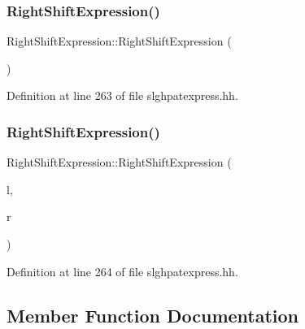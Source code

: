 \subsubsection{\texorpdfstring{RightShiftExpression()}{RightShiftExpression()}\hspace{0.1cm}{\footnotesize\ttfamily [1/2]}}
{\footnotesize\ttfamily Right\+Shift\+Expression\+::\+Right\+Shift\+Expression (\begin{DoxyParamCaption}\item[{void}]{ }\end{DoxyParamCaption})\hspace{0.3cm}{\ttfamily [inline]}}



Definition at line 263 of file slghpatexpress.\+hh.

\mbox{\label{class_right_shift_expression_ab56635d4e261a1e50ef8b1accbbca80e}} 
\subsubsection{\texorpdfstring{RightShiftExpression()}{RightShiftExpression()}\hspace{0.1cm}{\footnotesize\ttfamily [2/2]}}
{\footnotesize\ttfamily Right\+Shift\+Expression\+::\+Right\+Shift\+Expression (\begin{DoxyParamCaption}\item[{\mbox{\hyperlink{class_pattern_expression}{Pattern\+Expression}} $\ast$}]{l,  }\item[{\mbox{\hyperlink{class_pattern_expression}{Pattern\+Expression}} $\ast$}]{r }\end{DoxyParamCaption})\hspace{0.3cm}{\ttfamily [inline]}}



Definition at line 264 of file slghpatexpress.\+hh.



\subsection{Member Function Documentation}
\mbox{\label{class_right_shift_expression_a4b2484ca5edaa72d1afaf11a61ce1389}} 

